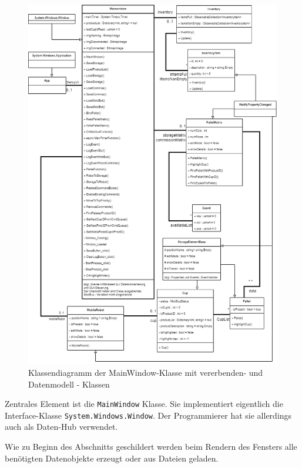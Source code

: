     \begin{figure}
        \caption[Klassendiagramm Datenmodells ]
        {\small Klassendiagramm der MainWindow-Klasse mit vererbenden- und Datenmodell - Klassen }\label{fig:figure2}
        \includegraphics[width = \textwidth ]{Bilder/LV_Klassendiagramm_Datenmodell}
        \centering
    \end{figure}
    \clearpage

    Zentrales Element ist die \verb|MainWindow| Klasse.
    Sie implementiert eigentlich die Interface-Klasse \verb|System.Windows.Window|.
    Der Programmierer hat sie allerdings auch als Daten-Hub verwendet.
    
    Wie zu Beginn des Abschnitts geschildert werden beim Rendern des Fensters alle benötigten Datenobjekte erzeugt oder aus Dateien geladen.

